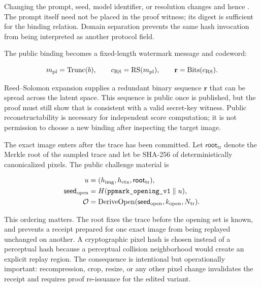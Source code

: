Changing the prompt, seed, model identifier, or resolution changes
\PPContextHash{} and hence \PPBinding{}.  The prompt itself need not be placed in
the proof witness; its digest is sufficient for the binding relation.  Domain
separation prevents the same hash invocation from being interpreted as another
protocol field.

The public binding becomes a fixed-length watermark message and codeword:

\begin{equation}
    m_{\mathrm{pl}}=\operatorname{Trunc}(b),
    \qquad
    c_{\mathrm{RS}}=\operatorname{RS}(m_{\mathrm{pl}}),
    \qquad
    \mathbf{r}=\operatorname{Bits}(c_{\mathrm{RS}}).
\label{eq:ch4-payload-codeword}
\end{equation}

Reed--Solomon expansion supplies a redundant binary sequence \(\mathbf r\) that
can be spread across the latent space.  This sequence is public once \PPBinding{}
is published, but the proof must still show that \PPBinding{} is consistent with a
valid secret-key witness.  Public reconstructability is necessary for independent
score computation; it is not permission to choose a new binding after inspecting
the target image.

The exact image enters after the trace has been committed.  Let
\(\mathsf{root}_{\mathrm{tr}}\) denote the Merkle root of the sampled trace and let
\PPImageHash{} be SHA-256 of deterministically canonicalized pixels.  The public
challenge material is

\begin{equation}
\begin{aligned}
    u
        &= (h_{\mathrm{img}},h_{\mathrm{ctx}},\mathsf{root}_{\mathrm{tr}}),\\
    \mathsf{seed}_{\mathrm{open}}
        &= H(\texttt{ppmark\_opening\_v1}\parallel u),\\
    \mathcal{O}
        &= \operatorname{DeriveOpen}
           (\mathsf{seed}_{\mathrm{open}},k_{\mathrm{open}},N_{\mathrm{tr}}).
\end{aligned}
\label{eq:ch4-opening-challenge}
\end{equation}

This ordering matters.  The root fixes the trace before the opening set is known,
and \PPImageHash{} prevents a receipt prepared for one exact image from being
replayed unchanged on another.  A cryptographic pixel hash is chosen instead of a
perceptual hash because a perceptual collision neighborhood would create an
explicit replay region.  The consequence is intentional but operationally
important: recompression, crop, resize, or any other pixel change invalidates the
receipt and requires proof re-issuance for the edited variant.

